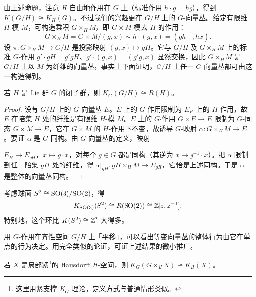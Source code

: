 由上述命题，注意 $H$ 自由地作用在 $G$ 上（标准作用 $h\cdot g=hg$），得到 $K(G/H)\cong K_H(G)$。不过我们的兴趣更在 $G/H$ 上的 $G$-向量丛。给定有限维 $H$-模 $M$，可构造乘积 $G\times_H M$，即 $G\times M$ 模去 $H$ 的作用：
\[
G\times_H M=G\times M\Big/(g,x)\sim h\cdot(g,x)=(gh^{-1},hx).
\]
设 $\pi:G\times_H M\to G/H$ 是投影映射 $(g,x)\mapsto gH$。它与 $G/H$ 及 $G\times_H M$ 上的标准 $G$-作用 $g'\cdot gH=g'gH$、$g'\cdot(g,x)=(g'g,x)$ 显然交换，因此 $G\times_H M$ 是 $G/H$ 上以 $M$ 为纤维的向量丛。事实上下面证明，$G/H$ 上任一 $G$-向量丛都可由这一构造得到。

\begin{proposition}
若 $H$ 是 Lie 群 $G$ 的闭子群，则 $K_G(G/H)\cong R(H)$。
\end{proposition}

\begin{proof}
设有 $G/H$ 上的 $G$-向量丛 $E$。$E$ 上的 $G$-作用限制为 $E_H$ 上的 $H$-作用，故 $E$ 在陪集 $H$ 处的纤维是有限维 $H$-模 $M$。$E$ 上的 $G$-作用 $G\times E\to E$ 限制为 $G$-同态 $G\times M\to E$，它在 $G\times M$ 的 $H$-作用下不变，故诱导 $G$-映射 $\alpha:G\times_H M\to E$。要证 $\alpha$ 是 $G$-同构。由 $G$-向量丛的定义，映射

$E_H\to E_{gH}$，$x\mapsto g\cdot x$，对每个 $g\in G$ 都是同构（其逆为 $x\mapsto g^{-1}\cdot x$）。把 $\alpha$ 限制到任一陪集 $gH$ 处的纤维，得 $\alpha|_{gH}:gH\times_H M\to E_{gH}$，它恰是上述同构。于是 $\alpha$ 是整体的向量丛同构。
\end{proof}


\begin{example}
考虑球面 $S^2\cong\mathrm{SO}(3)/\mathrm{SO}(2)$，得
\[
K_{\mathrm{SO}(3)}(S^2)\cong R(\mathrm{SO}(2))\cong\mathbb{Z}[z,z^{-1}].
\]
特别地，这个环比 $K(S^2)\cong\mathbb{Z}^2$ 大得多。
\end{example}

用 $G$-作用在齐性空间 $G/H$ 上「平移」，可以看出等变向量丛的整体行为由它在单点的行为决定。用完全类似的论证，可证上述结果的微小推广。

\begin{proposition}
若 $X$ 是局部紧\footnote{这里用紧支撑 $K_G$ 理论，定义方式与普通情形类似。}的 Hausdorff $H$-空间，则 $K_G(G\times_H X)\cong K_H(X)$。
\end{proposition}

